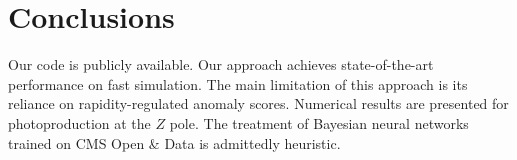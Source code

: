 \section{Conclusions}\label{sec:conclusions}

Our code is publicly available. Our approach achieves state-of-the-art
performance on fast simulation. The main limitation of this approach is
its reliance on rapidity-regulated anomaly scores. Numerical results are
presented for photoproduction at the $Z$ pole. The treatment of Bayesian
neural networks trained on CMS Open & Data is admittedly heuristic.

